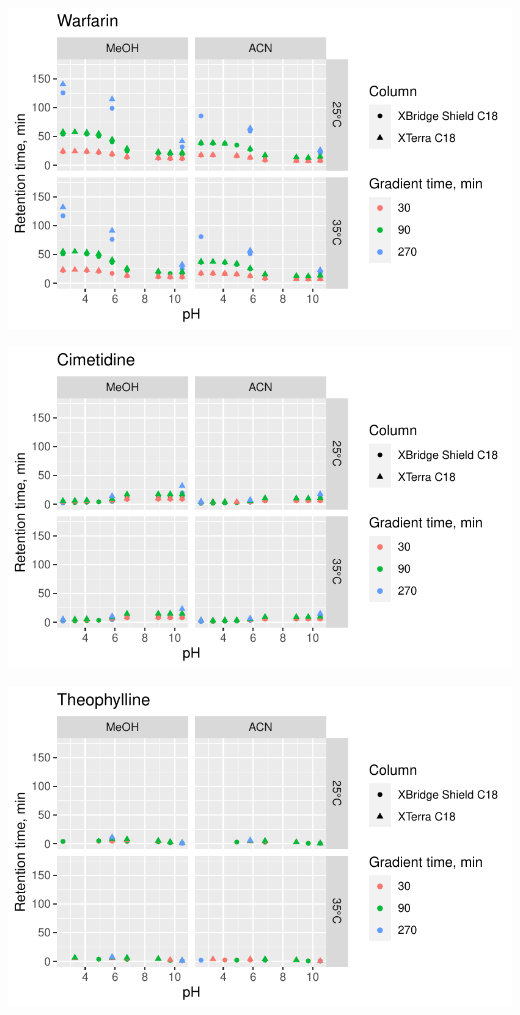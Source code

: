 \documentclass[
  letterpaper,
  DIV=11,
  numbers=noendperiod]{scrreprt}
\begin{document}
\includegraphics{index_files/figure-pdf/unnamed-chunk-4-24.pdf}

\includegraphics{index_files/figure-pdf/unnamed-chunk-4-25.pdf}

\includegraphics{index_files/figure-pdf/unnamed-chunk-4-26.pdf}
\end{document}
